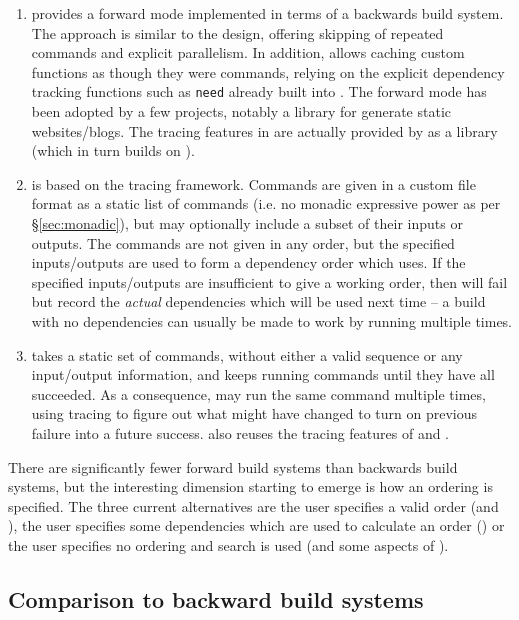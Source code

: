 \begin{enumerate}
\item \Shake \cite{shake} provides a forward mode implemented in terms of a backwards build system. The approach is similar to the \Fabricate design, offering skipping of repeated commands and explicit parallelism. In addition, \Shake allows caching custom functions as though they were commands, relying on the explicit dependency tracking functions such as \texttt{need} already built into \Shake. The forward mode has been adopted by a few projects, notably a library for generate static websites/blogs. The tracing features in \Rattle are actually provided by \Shake as a library (which in turn builds on \Fsatrace).
\item \Fac \cite{fac} is based on the \Bigbro tracing framework. Commands are given in a custom file format as a static list of commands (i.e. no monadic expressive power as per \S\ref{sec:monadic}), but may optionally include a subset of their inputs or outputs. The commands are not given in any order, but the specified inputs/outputs are used to form a dependency order which \Fac uses. If the specified inputs/outputs are insufficient to give a working order, then \Fac will fail but record the \emph{actual} dependencies which will be used next time -- a build with no dependencies can usually be made to work by running \Fac multiple times.
\item \Stroll \cite{stroll} takes a static set of commands, without either a valid sequence or any input/output information, and keeps running commands until they have all succeeded. As a consequence, \Stroll may run the same command multiple times, using tracing to figure out what might have changed to turn on previous failure into a future success. \Stroll also reuses the tracing features of \Shake and \Fsatrace.
\end{enumerate}

There are significantly fewer forward build systems than backwards build systems, but the interesting dimension starting to emerge is how an ordering is specified. The three current alternatives are the user specifies a valid order (\Fabricate and \Rattle), the user specifies some dependencies which are used to calculate an order (\Fac) or the user specifies no ordering and search is used (\Stroll and some aspects of \Fac).

\subsection{Comparison to backward build systems}

